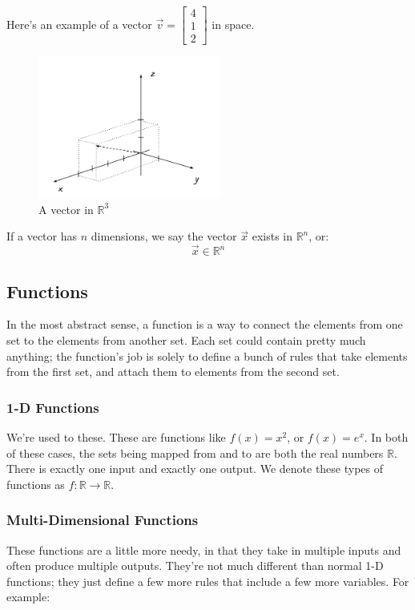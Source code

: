 \documentclass{article}
\begin{document}
Here's an example of a vector $\vec{v} = \begin{bmatrix}4 \\ 1 \\ 2\end{bmatrix}$ in space.

\begin{figure}[htp]
    \centering
    \includegraphics[width=6cm]{vector}
    \caption{A vector in $\mathbb{R}^3$}
\end{figure}

If a vector has $n$ dimensions, we say the vector $\vec{x}$ exists in $\mathbb{R}^n$, or: $$\vec{x} \in \mathbb{R}^n$$

\subsection{Functions}

In the most abstract sense, a function is a way to connect the elements from one set to the elements from another set. Each set could contain pretty much anything; the function's job is solely to define a bunch of rules that take elements from the first set, and attach them to elements from the second set.

\subsubsection{1-D Functions}
We're used to these. These are functions like $f(x) = x^2$, or $f(x) = e^x$. In both of these cases, the sets being mapped from and to are both the real numbers $\mathbb{R}$. There is exactly one input and exactly one output. We denote these types of functions as $f: \mathbb{R} \to \mathbb{R}$.

\subsubsection{Multi-Dimensional Functions}
These functions are a little more needy, in that they take in multiple inputs and often produce multiple outputs. They're not much different than normal 1-D functions; they just define a few more rules that include a few more variables. For example:
\end{document}
